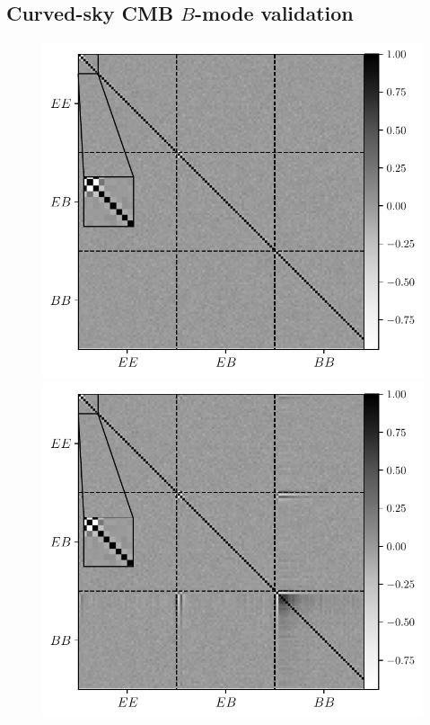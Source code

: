 \documentclass[usenatbib]{mnrasb}
\begin{document}
    \subsection{Curved-sky CMB \texorpdfstring{$B$}{B}-mode validation}\label{ssec:validation.cmb_full}
      \begin{figure}
        \centering
        \includegraphics[width=0.99\columnwidth]{val_covar_cmb_sph_nocont}
        \includegraphics[width=0.99\columnwidth]{val_covar_cmb_sph}

\end{figure}
\end{document}
